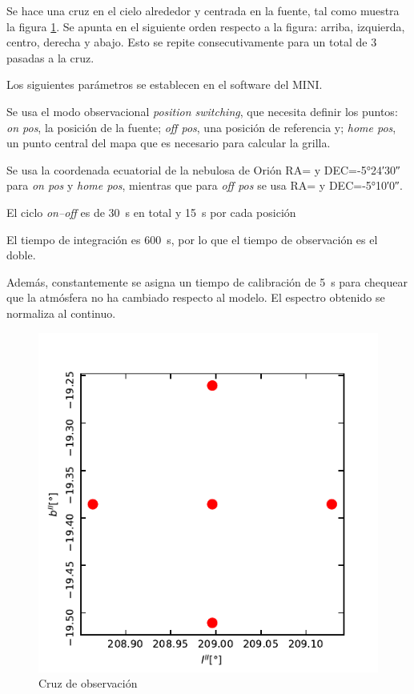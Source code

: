 Se hace una cruz en el cielo alrededor y centrada en la fuente, tal como muestra la figura \ref{fig:cruz}. Se apunta en el siguiente orden respecto a la figura: arriba, izquierda, centro, derecha y abajo. Esto se repite consecutivamente para un total de 3 pasadas a la cruz.

Los siguientes parámetros se establecen en el software del MINI.

Se usa el modo observacional \textit{position switching}, que necesita definir los puntos: \textit{on pos}, la posición de la fuente; \textit{off pos}, una posición de referencia y; \textit{home pos}, un punto central del mapa que es necesario para calcular la grilla.

Se usa la coordenada ecuatorial de la nebulosa de Orión RA= y DEC=\ang{-5;24;30} para \textit{on pos} y \textit{home pos}, mientras que para \textit{off pos} se usa RA= y DEC=\ang{-5;10;0}.

El ciclo \textit{on--off} es de \SI{30}{\second} en total y \SI{15}{\second} por cada posición

El tiempo de integración es \SI{600}{\second}, por lo que el tiempo de observación es el doble.

Además, constantemente se asigna un tiempo de calibración de \SI{5}{\second} para chequear que la atmósfera no ha cambiado respecto al modelo. El espectro obtenido se normaliza al continuo.

\begin{figure}[p]
	\centering
	\includegraphics{rsc/cruz.pdf}
	\caption{Cruz de observación}
	\label{fig:cruz}
\end{figure}

